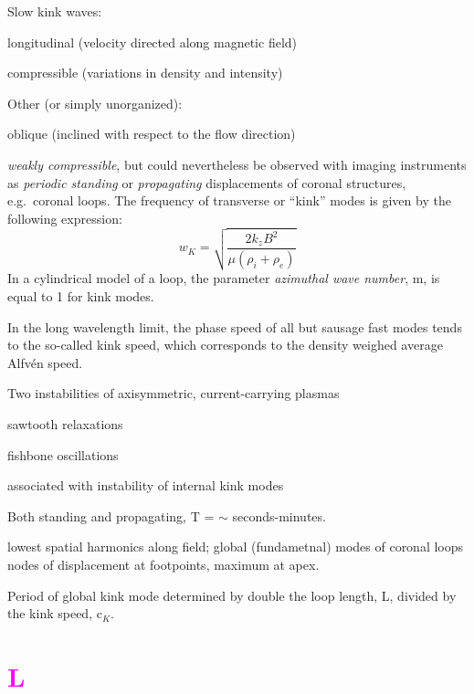 \documentclass[12pt]{article}
\begin{document}
Slow kink waves:
\begin{itemize*}
    \item longitudinal (velocity directed along magnetic field)
    \item compressible (variations in density and intensity)
\end{itemize*}

Other (or simply unorganized):
\begin{itemize*}
    \item oblique (inclined with respect to the flow direction)
    \item \emph{weakly compressible}, but could nevertheless be
        observed with imaging instruments as \emph{periodic standing}
        or \emph{propagating} displacements of coronal structures, e.g.\ coronal loops.
        The frequency of transverse or ``kink'' modes is given by the following expression:
            $$ w_K = \sqrt{ \frac{2k_zB^2}{\mu(\rho_i+\rho_e)}  }   $$
        In a cylindrical model of a loop,
        the parameter \emph{azimuthal wave number},
        m, is equal to 1 for kink modes.
    \item In the long wavelength limit, the phase speed of all but
        sausage fast modes tends to the so-called kink speed,
        which corresponds to the density weighed average Alfv\'en speed.
    \item Two instabilities of axisymmetric, current-carrying plasmas
        \begin{itemize*}
            \item sawtooth relaxations
            \item fishbone oscillations
        \end{itemize*}
        associated with instability of internal kink modes
    \item Both standing and propagating, T = $\sim$ seconds-minutes.
    \item lowest spatial harmonics along field; global (fundametnal)
        modes of coronal loops nodes of displacement at footpoints,
        maximum at apex.
    \item Period of global kink mode determined by double the loop length,
        L, divided by the kink speed, c$_K$.
\end{itemize*}


\section*{\textcolor{magenta}{L}}
\end{document}
